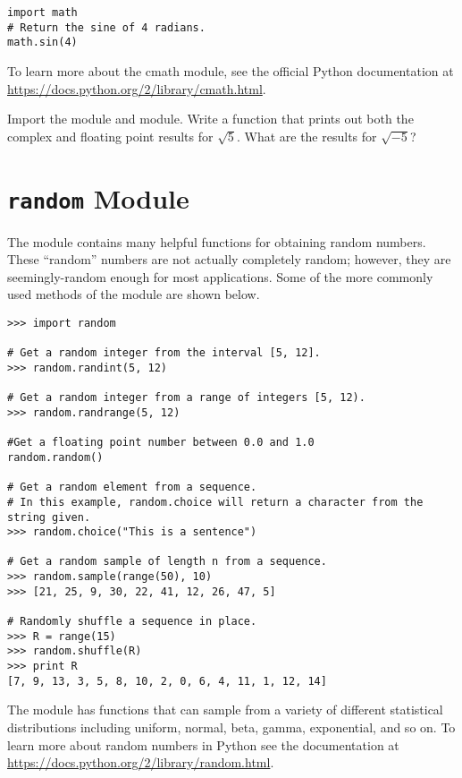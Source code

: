 \begin{lstlisting}
import math
# Return the sine of 4 radians.
math.sin(4)
\end{lstlisting}

To learn more about the cmath module, see the official Python documentation at \url{https://docs.python.org/2/library/cmath.html}.

\begin{problem}
Import the  module and  module. Write a function that prints out both the complex and floating point results for $\sqrt{5}$.  What are the results for $\sqrt{-5}$?
\end{problem}

\section*{\texttt{random} Module}
The  module contains many helpful functions for obtaining random numbers.
These ``random'' numbers are not actually completely random; however, they are seemingly-random enough for most applications.
Some of the more commonly used methods of the  module are shown below.
\begin{lstlisting}
>>> import random

# Get a random integer from the interval [5, 12].
>>> random.randint(5, 12)

# Get a random integer from a range of integers [5, 12).
>>> random.randrange(5, 12)

#Get a floating point number between 0.0 and 1.0
random.random()

# Get a random element from a sequence. 
# In this example, random.choice will return a character from the string given.
>>> random.choice("This is a sentence")

# Get a random sample of length n from a sequence.
>>> random.sample(range(50), 10)
>>> [21, 25, 9, 30, 22, 41, 12, 26, 47, 5]

# Randomly shuffle a sequence in place.
>>> R = range(15)
>>> random.shuffle(R)
>>> print R
[7, 9, 13, 3, 5, 8, 10, 2, 0, 6, 4, 11, 1, 12, 14]

\end{lstlisting}

\begin{info}
The  module has functions that can sample from a variety of different statistical distributions including uniform, normal, beta, gamma, exponential, and so on. To learn more about random numbers in Python see the documentation at \url{https://docs.python.org/2/library/random.html}.
\end{info}

